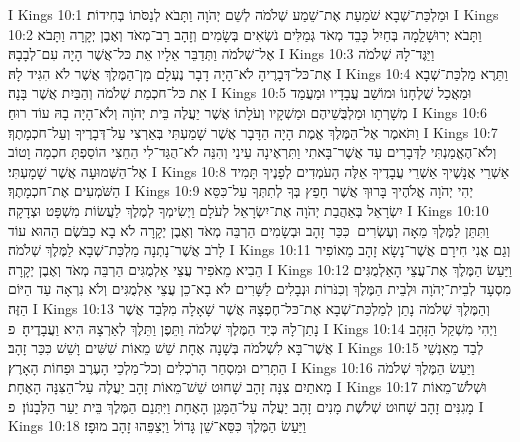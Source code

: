 I Kings 10:1	וּמַלְכַּת־שְׁבָא שֹׁמַעַת אֶת־שֵׁמַע שְׁלֹמֹה לְשֵׁם יְהֹוָה וַתָּבֹא לְנַסֹּתוֹ בְּחִידוֹת׃
I Kings 10:2	וַתָּבֹא יְרוּשָׁלַ͏ְמָה בְּחַיִל כָּבֵד מְאֹד גְּמַלִּים נֹשְׂאִים בְּשָׂמִים וְזָהָב רַב־מְאֹד וְאֶבֶן יְקָרָה וַתָּבֹא אֶל־שְׁלֹמֹה וַתְּדַבֵּר אֵלָיו אֵת כּל־אֲשֶׁר הָיָה עִם־לְבָבָהּ׃
I Kings 10:3	וַיַּגֶּד־לָהּ שְׁלֹמֹה אֶת־כּל־דְּבָרֶיהָ לֹא־הָיָה דָבָר נֶעְלָם מִן־הַמֶּלֶךְ אֲשֶׁר לֹא הִגִּיד לָהּ׃
I Kings 10:4	וַתֵּרֶא מַלְכַּת־שְׁבָא אֵת כּל־חכְמַת שְׁלֹמֹה וְהַבַּיִת אֲשֶׁר בָּנָה׃
I Kings 10:5	וּמַאֲכַל שֻׁלְחָנוֹ וּמוֹשַׁב עֲבָדָיו וּמַעֲמַד מְשָׁרְתָו וּמַלְבֻּשֵׁיהֶם וּמַשְׁקָיו וְעֹלָתוֹ אֲשֶׁר יַעֲלֶה בֵּית יְהֹוָה וְלֹא־הָיָה בָהּ עוֹד רוּחַ׃
I Kings 10:6	וַתֹּאמֶר אֶל־הַמֶּלֶךְ אֱמֶת הָיָה הַדָּבָר אֲשֶׁר שָׁמַעְתִּי בְּאַרְצִי עַל־דְּבָרֶיךָ וְעַל־חכְמָתֶךָ׃
I Kings 10:7	וְלֹא־הֶאֱמַנְתִּי לַדְּבָרִים עַד אֲשֶׁר־בָּאתִי וַתִּרְאֶינָה עֵינַי וְהִנֵּה לֹא־הֻגַּד־לִי הַחֵצִי הוֹסַפְתָּ חכְמָה וָטוֹב אֶל־הַשְּׁמוּעָה אֲשֶׁר שָׁמָעְתִּי׃
I Kings 10:8	אַשְׁרֵי אֲנָשֶׁיךָ אַשְׁרֵי עֲבָדֶיךָ אֵלֶּה הָעֹמְדִים לְפָנֶיךָ תָּמִיד הַשֹּׁמְעִים אֶת־חכְמָתֶךָ׃
I Kings 10:9	יְהִי יְהֹוָה אֱלֹהֶיךָ בָּרוּךְ אֲשֶׁר חָפֵץ בְּךָ לְתִתְּךָ עַל־כִּסֵּא יִשְׂרָאֵל בְּאַהֲבַת יְהֹוָה אֶת־יִשְׂרָאֵל לְעֹלָם וַיְשִׂימְךָ לְמֶלֶךְ לַעֲשׂוֹת מִשְׁפָּט וּצְדָקָה׃
I Kings 10:10	וַתִּתֵּן לַמֶּלֶךְ מֵאָה וְעֶשְׂרִים  כִּכַּר זָהָב וּבְשָׂמִים הַרְבֵּה מְאֹד וְאֶבֶן יְקָרָה לֹא בָא כַבֹּשֶׂם הַהוּא עוֹד לָרֹב אֲשֶׁר־נָתְנָה מַלְכַּת־שְׁבָא לַמֶּלֶךְ שְׁלֹמֹה׃
I Kings 10:11	וְגַם אֳנִי חִירָם אֲשֶׁר־נָשָׂא זָהָב מֵאוֹפִיר הֵבִיא מֵאֹפִיר עֲצֵי אַלְמֻגִּים הַרְבֵּה מְאֹד וְאֶבֶן יְקָרָה׃
I Kings 10:12	וַיַּעַשׂ הַמֶּלֶךְ אֶת־עֲצֵי הָאַלְמֻגִּים מִסְעָד לְבֵית־יְהֹוָה וּלְבֵית הַמֶּלֶךְ וְכִנֹּרוֹת וּנְבָלִים לַשָּׁרִים לֹא בָא־כֵן עֲצֵי אַלְמֻגִּים וְלֹא נִרְאָה עַד הַיּוֹם הַזֶּה׃
I Kings 10:13	וְהַמֶּלֶךְ שְׁלֹמֹה נָתַן לְמַלְכַּת־שְׁבָא אֶת־כּל־חֶפְצָהּ אֲשֶׁר שָׁאָלָה מִלְּבַד אֲשֶׁר נָתַן־לָהּ כְּיַד הַמֶּלֶךְ שְׁלֹמֹה וַתֵּפֶן וַתֵּלֶךְ לְאַרְצָהּ הִיא וַעֲבָדֶיהָ׃ {פ}
I Kings 10:14	וַיְהִי מִשְׁקַל הַזָּהָב אֲשֶׁר־בָּא לִשְׁלֹמֹה בְּשָׁנָה אֶחָת שֵׁשׁ מֵאוֹת שִׁשִּׁים וָשֵׁשׁ כִּכַּר זָהָב׃
I Kings 10:15	לְבַד מֵאַנְשֵׁי הַתָּרִים וּמִסְחַר הָרֹכְלִים וְכל־מַלְכֵי הָעֶרֶב וּפַחוֹת הָאָרֶץ׃
I Kings 10:16	וַיַּעַשׂ הַמֶּלֶךְ שְׁלֹמֹה מָאתַיִם צִנָּה זָהָב שָׁחוּט שֵׁשׁ־מֵאוֹת זָהָב יַעֲלֶה עַל־הַצִּנָּה הָאֶחָת׃
I Kings 10:17	וּשְׁלֹשׁ־מֵאוֹת מָגִנִּים זָהָב שָׁחוּט שְׁלֹשֶׁת מָנִים זָהָב יַעֲלֶה עַל־הַמָּגֵן הָאֶחָת וַיִּתְּנֵם הַמֶּלֶךְ בֵּית יַעַר הַלְּבָנוֹן׃ {פ}
I Kings 10:18	וַיַּעַשׂ הַמֶּלֶךְ כִּסֵּא־שֵׁן גָּדוֹל וַיְצַפֵּהוּ זָהָב מוּפָז׃

